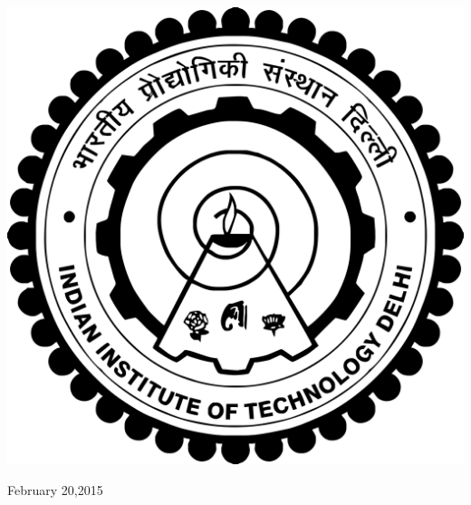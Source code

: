 \documentclass[11pt,fleqn]{book} %
\begin{document}
\begin{titlepage}

\vspace{30mm}

\includegraphics[scale=0.05]{iitd}\\[1cm] %
 

\vspace{30mm}

{\large February 20,2015}\\[2cm] %



\end{titlepage}
\end{document}
